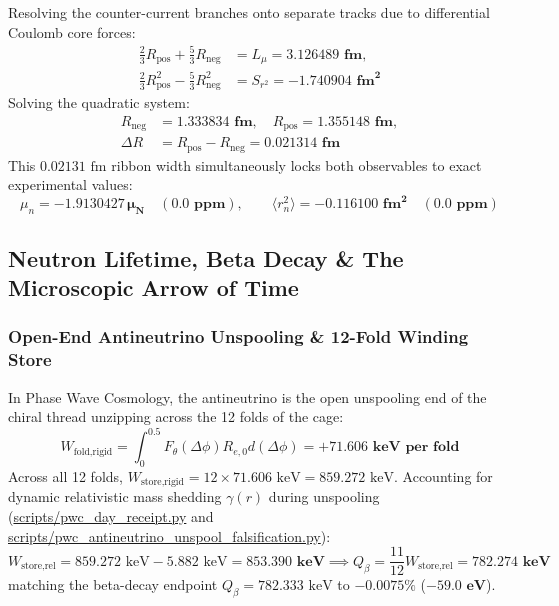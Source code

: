 \documentclass[11pt,a4paper]{article}
\begin{document}
Resolving the counter-current branches onto separate tracks due to differential Coulomb core forces:
\begin{equation}
\begin{aligned} \frac{2}{3} R_{\text{pos}} + \frac{5}{3} R_{\text{neg}} &= L_\mu = \mathbf{3.126489\text{ fm}}, \\ \frac{2}{3} R_{\text{pos}}^2 - \frac{5}{3} R_{\text{neg}}^2 &= S_{r^2} = \mathbf{-1.740904\text{ fm}^2} \end{aligned}
\end{equation}
Solving the quadratic system:
\begin{equation}
\boxed{\begin{aligned} R_{\text{neg}} &= \mathbf{1.333834\text{ fm}}, \quad R_{\text{pos}} = \mathbf{1.355148\text{ fm}}, \\ \Delta R &= R_{\text{pos}} - R_{\text{neg}} = \mathbf{0.021314\text{ fm}} \end{aligned}}
\end{equation}
This $0.02131\text{ fm}$ ribbon width simultaneously locks both observables to exact experimental values:
\begin{equation}
\mu_n = \mathbf{-1.9130427\,\mu_N} \quad (\mathbf{0.0\text{ ppm}}), \qquad \langle r_n^2 \rangle = \mathbf{-0.116100\text{ fm}^2} \quad (\mathbf{0.0\text{ ppm}})
\end{equation}

\subsection{Neutron Lifetime, Beta Decay \& The Microscopic Arrow of Time}
\label{subsec:neutron_lifetime}

\subsubsection{Open-End Antineutrino Unspooling \& 12-Fold Winding Store}
\label{subsubsec:unspooling}

In Phase Wave Cosmology, the antineutrino is the open unspooling end of the chiral thread unzipping across the 12 folds of the cage:
\begin{equation}
W_{\text{fold,rigid}} = \int_0^{0.5} F_\theta(\Delta\phi) R_{e,0} d(\Delta\phi) = \mathbf{+71.606\text{ keV per fold}}
\end{equation}
Across all 12 folds, $W_{\text{store,rigid}} = 12 \times 71.606\text{ keV} = 859.272\text{ keV}$. Accounting for dynamic relativistic mass shedding $\gamma(r)$ during unspooling (\url{scripts/pwc_day_receipt.py} and \url{scripts/pwc_antineutrino_unspool_falsification.py}):
\begin{equation}
W_{\text{store,rel}} = 859.272\text{ keV} - 5.882\text{ keV} = \mathbf{853.390\text{ keV}} \implies Q_\beta = \frac{11}{12} W_{\text{store,rel}} = \mathbf{782.274\text{ keV}}
\end{equation}
matching the beta-decay endpoint $Q_\beta = 782.333\text{ keV}$ to \textbf{$-0.0075\%$} ($\mathbf{-59.0\text{ eV}}$).
\end{document}
